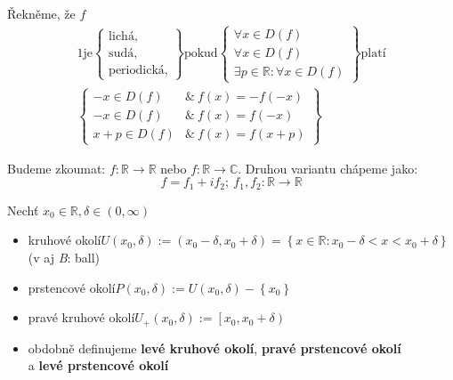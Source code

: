 \begin{definition}[name=Symetrie funkce, label=def:symetry]
    Řekněme, že $f$
    \begin{alignat}{1}
        \text{je}\left.
        \begin{cases}
            \text{lichá,} \\
            \text{sudá,} \\
            \text{periodická,}
        \end{cases}
        \right\} \text{pokud}\left.
        \begin{cases}
            \forall x\in D(f) \\
            \forall x\in D(f) \\
            \exists p\in\mathbb{R}:\forall x\in D(f)
        \end{cases}
        \right\} \text{platí} \nonumber\\
        \left.
        \begin{cases}
            -x\in D(f)&\&~f(x)=-f(-x) \\
            -x\in D(f)&\&~f(x)=f(-x) \\
            x+p\in D(f)&\&~f(x)=f(x+p) 
        \end{cases}
        \right\}
    \end{alignat}
\end{definition}

Budeme zkoumat: $f:\mathbb{R}\rightarrow\mathbb{R}$ nebo $f:\mathbb{R}\rightarrow\mathbb{C}$.
Druhou variantu chápeme jako:
\begin{equation}
    f=f_1+if_2;~f_1,f_2:\mathbb{R}\rightarrow\mathbb{R}
\end{equation}

\begin{definition}[name=Okolí, label=def:neighbourhood]
    Nechť $x_0\in\mathbb{R}, \delta\in(0,\infty)$
    \begin{itemize}
        \item kruhové okolí\quad $U(x_0,\delta):=(x_0-\delta, x_0+\delta)=
            \left\{x\in\mathbb{R}:x_0-\delta<x<x_0+\delta\right\}$ \\
        (v aj \textit{B}: ball)
        \item prstencové okolí\quad $P(x_0,\delta):=U(x_0,\delta)-\left\{x_0\right\}$
        \item pravé kruhové okolí\quad $U_+(x_0,\delta):=\left[x_0,x_0+\delta\right)$
        \item obdobně definujeme \textbf{levé kruhové okolí}, \textbf{pravé prstencové okolí} \\
            a \textbf{levé prstencové okolí}
    \end{itemize}
\end{definition}

